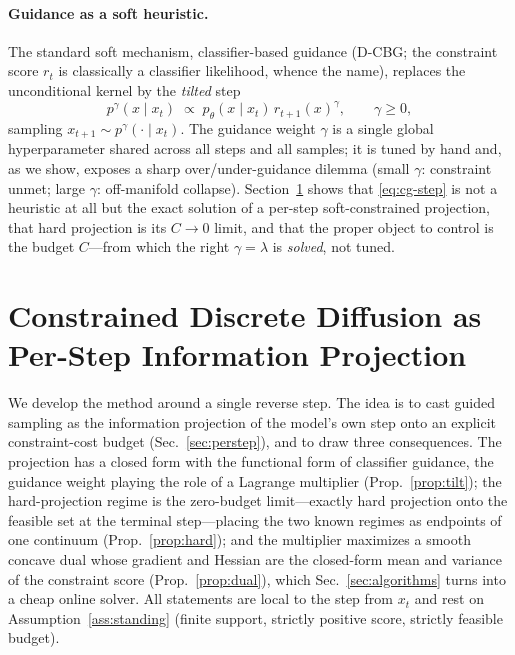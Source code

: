 \documentclass{article}
\begin{document}
\paragraph{Guidance as a soft heuristic.} The standard soft mechanism, classifier-based guidance (D-CBG; the constraint score $r_t$ is classically a classifier likelihood, whence the name), replaces the unconditional kernel by the \emph{tilted} step
\begin{equation}
\label{eq:cg-step}
p^{\gamma}(x\mid x_t)\;\propto\;p_\theta(x\mid x_t)\,r_{t+1}(x)^{\gamma},
\qquad \gamma\ge 0,
\end{equation}
sampling $x_{t+1}\sim p^\gamma(\cdot\mid x_t)$. The guidance weight $\gamma$ is a single global hyperparameter shared across all steps and all samples; it is tuned by hand and, as we show, exposes a sharp over/under-guidance dilemma (small $\gamma$: constraint unmet; large $\gamma$: off-manifold collapse). Section~\ref{sec:method} shows that \eqref{eq:cg-step} is not a heuristic at all but the exact solution of a per-step soft-constrained projection, that hard projection is its $C\to0$ limit, and that the proper object to control is the budget $C$---from which the right $\gamma=\lambda$ is \emph{solved}, not tuned.

\section{Constrained Discrete Diffusion as Per-Step Information Projection}
\label{sec:method}

We develop the method around a single reverse step. The idea is to cast guided sampling as the information projection of the model's own step onto an explicit constraint-cost budget (Sec.~\ref{sec:perstep}), and to draw three consequences. The projection has a closed form with the functional form of classifier guidance, the guidance weight playing the role of a Lagrange multiplier (Prop.~\ref{prop:tilt}); the hard-projection regime is the zero-budget limit---exactly hard projection onto the feasible set at the terminal step---placing the two known regimes as endpoints of one continuum (Prop.~\ref{prop:hard}); and the multiplier maximizes a smooth concave dual whose gradient and Hessian are the closed-form mean and variance of the constraint score (Prop.~\ref{prop:dual}), which Sec.~\ref{sec:algorithms} turns into a cheap online solver. All statements are local to the step from $x_t$ and rest on Assumption~\ref{ass:standing} (finite support, strictly positive score, strictly feasible budget).
\end{document}
